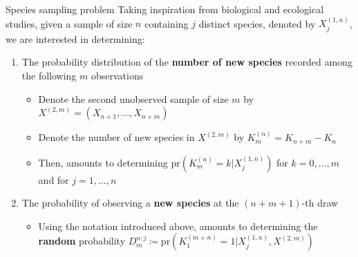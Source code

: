 \documentclass[11pt]{beamer}
\newcommand{\circled}[1]{%
  \scalebox{0.6}{\tikz\node%
    [outer sep=0pt, inner sep=2pt,
      line width=0pt,text=white,fill=blue!50,draw,circle,shading=ball]{#1};%
  }%
}
\newcommand{\bref}[1]{\circled{\ref{#1}}}
\begin{document}
\begin{frame}{Species sampling problem}
    Taking inspiration from biological and ecological studies, given a sample of size \(n\) containing \(j\) distinct species, denoted by \(X_j^{(1,n)}\), we are interested in determining:
    \begin{enumerate}
        \item<2->\label{item:one} The probability distribution of the \textbf{number of new species} recorded among the following \(m\) observations
        \begin{itemize}
            \item Denote the second unobserved sample of size \(m\) by \(X^{(2, m)} = (X_{n+1},...,X_{n+m})\)
            \item Denote the number of new species in \(X^{(2, m)}\) by \(K_m^{(n)} = K_{n + m} - K_n\)
            \item Then, \bref{item:one} amounts to determining \(\text{pr}(K_m^{(n)} = k | X_j^{(1,n)})\) for \(k = 0,...,m\) and for \(j = 1,...,n\) %
        \end{itemize}
        \item<3->\label{item:two} The probability of observing a \textbf{new species} at the \((n + m + 1)\)-th draw
        \begin{itemize}
            \item Using the notation introduced above, \bref{item:two} amounts to determining the \textbf{random} probability \(D_m^{n:j} \coloneqq \text{pr}(K_1^{(m + n)} = 1 | X_j^{(1,n)}, X^{(2, m)})\) %
        \end{itemize}
    \end{enumerate}
\end{frame}
\end{document}

